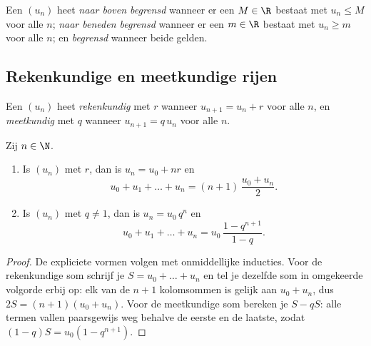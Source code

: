 \begin{definition}\label{def:g12:seq:bounded}
Een  $(u_n)$ heet \emph{naar boven begrensd} wanneer
er een $M \in \R$ bestaat met $u_n \leq M$ voor alle $n$; \emph{naar beneden
begrensd} wanneer er een $m \in \R$ bestaat met $u_n \geq m$ voor alle $n$; en
\emph{begrensd} wanneer beide gelden.
\end{definition}

\subsection{Rekenkundige en meetkundige rijen}

\begin{definition}\label{def:g12:seq:arith-geom}
Een  $(u_n)$ heet \emph{rekenkundig} met 
$r$ wanneer $u_{n+1} = u_n + r$ voor alle $n$, en
\emph{meetkundig} met  $q$ wanneer
$u_{n+1} = q\,u_n$ voor alle $n$.
\end{definition}

\begin{proposition}\label{prop:g12:seq:arith-geom}
Zij $n \in \N$.
\begin{enumerate}
  \item Is $(u_n)$  met  $r$, dan is $u_n = u_0 + nr$ en
        \[
        u_0 + u_1 + \dots + u_n = (n+1)\,\frac{u_0 + u_n}{2}.
        \]
  \item Is $(u_n)$  met  $q \neq 1$, dan is $u_n = u_0\, q^n$
        en
        \[
        u_0 + u_1 + \dots + u_n = u_0\,\frac{1 - q^{n+1}}{1 - q}.
        \]
\end{enumerate}
\end{proposition}

\begin{proof}
De expliciete vormen volgen met onmiddellijke inducties. Voor de
rekenkundige som schrijf je $S = u_0 + \dots + u_n$ en tel je dezelfde som in
omgekeerde volgorde erbij op: elk van de $n+1$ kolomsommen is gelijk aan
$u_0 + u_n$, dus $2S = (n+1)(u_0+u_n)$. Voor de meetkundige som bereken je
$S - qS$: alle termen vallen paarsgewijs weg behalve de eerste en de laatste,
zodat $(1-q)S = u_0(1 - q^{n+1})$.
\end{proof}

